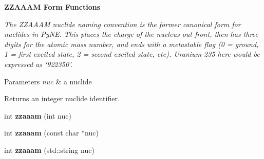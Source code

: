 \begin{Indent}{\bf Z\+Z\+A\+A\+AM Form Functions}\par
{\em The Z\+Z\+A\+A\+AM nuclide naming convention is the former canonical form for nuclides in Py\+NE. This places the charge of the nucleus out front, then has three digits for the atomic mass number, and ends with a metastable flag (0 = ground, 1 = first excited state, 2 = second excited state, etc). Uranium-\/235 here would be expressed as ‘922350’. 
\begin{DoxyParams}{Parameters}
{\em nuc} & a nuclide \\
\hline
\end{DoxyParams}
\begin{DoxyReturn}{Returns}
an integer nuclide identifier. 
\end{DoxyReturn}
}\begin{DoxyCompactItemize}
\item 
int {\bfseries zzaaam} (int nuc)\hypertarget{namespacepyne_1_1nucname_ac28bf4202f94c1902bdcb2f0caf314e3}{}\label{namespacepyne_1_1nucname_ac28bf4202f94c1902bdcb2f0caf314e3}

\item 
int {\bfseries zzaaam} (const char $\ast$nuc)\hypertarget{namespacepyne_1_1nucname_afdb6c13f3fd672eb80d2551752509b1b}{}\label{namespacepyne_1_1nucname_afdb6c13f3fd672eb80d2551752509b1b}

\item 
int {\bfseries zzaaam} (std\+::string nuc)\hypertarget{namespacepyne_1_1nucname_aff543a0a9df5e199902780b49d4e82f6}{}\label{namespacepyne_1_1nucname_aff543a0a9df5e199902780b49d4e82f6}

\end{DoxyCompactItemize}
\end{Indent}

